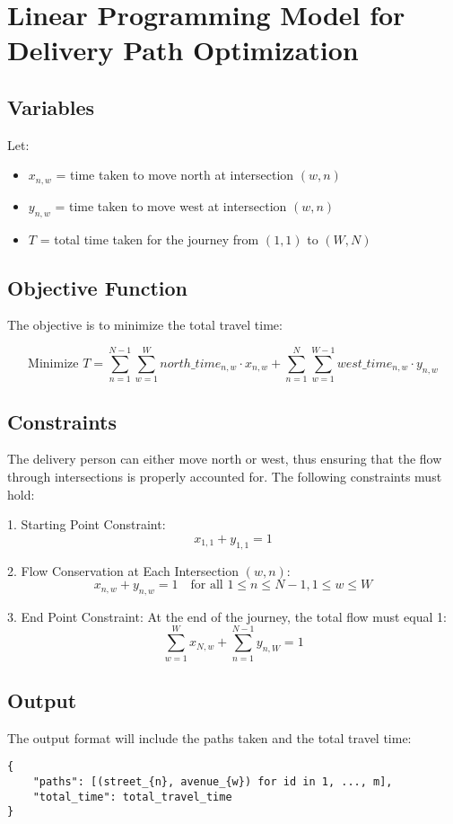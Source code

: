 \documentclass{article}
\begin{document}
\section*{Linear Programming Model for Delivery Path Optimization}

\subsection*{Variables}
Let:
\begin{itemize}
    \item \( x_{n,w} \) = time taken to move north at intersection \( (w, n) \)
    \item \( y_{n,w} \) = time taken to move west at intersection \( (w, n) \)
    \item \( T \) = total time taken for the journey from \( (1, 1) \) to \( (W, N) \)
\end{itemize}

\subsection*{Objective Function}
The objective is to minimize the total travel time:

\[
\text{Minimize } T = \sum_{n=1}^{N-1} \sum_{w=1}^{W} north\_time_{n,w} \cdot x_{n,w} + \sum_{n=1}^{N} \sum_{w=1}^{W-1} west\_time_{n,w} \cdot y_{n,w}
\]

\subsection*{Constraints}
The delivery person can either move north or west, thus ensuring that the flow through intersections is properly accounted for. The following constraints must hold:

1. Starting Point Constraint:
\[
x_{1,1} + y_{1,1} = 1
\]

2. Flow Conservation at Each Intersection \( (w, n) \):
\[
x_{n,w} + y_{n,w} = 1 \quad \text{for all } 1 \leq n \leq N-1, 1 \leq w \leq W
\]

3. End Point Constraint:
At the end of the journey, the total flow must equal 1:
\[
\sum_{w=1}^{W} x_{N,w} + \sum_{n=1}^{N-1} y_{n,W} = 1
\]

\subsection*{Output}
The output format will include the paths taken and the total travel time:
\begin{verbatim}
{
    "paths": [(street_{n}, avenue_{w}) for id in 1, ..., m],
    "total_time": total_travel_time
}
\end{verbatim}
\end{document}
